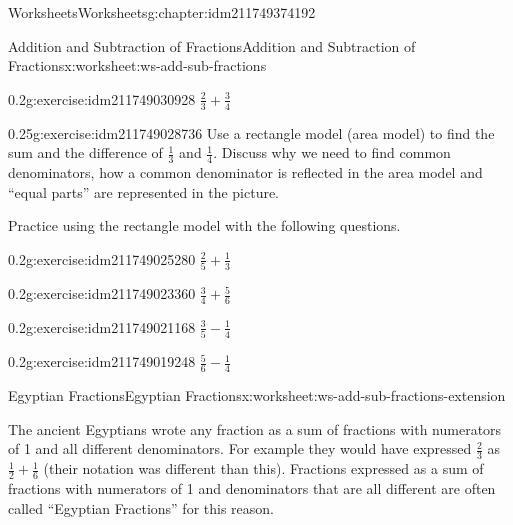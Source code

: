 \documentclass[twoside,11pt,]{book}
\begin{document}
\begin{chapterptx}{Worksheets}{}{Worksheets}{}{}{g:chapter:idm211749374192}
\begin{worksheet-section-numberless}{Addition and Subtraction of Fractions}{}{Addition and Subtraction of Fractions}{}{}{x:worksheet:ws-add-sub-fractions}
\begin{divisionexercise}{3}{}{0.2}{g:exercise:idm211749030928}%
\(\frac{2}{3} + \frac{3}{4} \)%
\end{divisionexercise}%
\clearpage
\begin{divisionexercise}{4}{}{0.25}{g:exercise:idm211749028736}%
Use a rectangle model (area model) to find the sum and the difference of \(\frac{1}{3} \) and \(\frac{1}{4} \).  Discuss why we need to find common denominators, how a common denominator is reflected in the area model and “equal parts” are represented in the picture.%
\end{divisionexercise}%
\begin{introduction}{}%
Practice using the rectangle model with the following questions.%
\end{introduction}%
\begin{divisionexercise}{5}{}{0.2}{g:exercise:idm211749025280}%
\(\frac{2}{5} + \frac{1}{3} \)%
\end{divisionexercise}%
\begin{divisionexercise}{6}{}{0.2}{g:exercise:idm211749023360}%
\(\frac{3}{4} + \frac{5}{6} \)%
\end{divisionexercise}%
\clearpage
\begin{divisionexercise}{7}{}{0.2}{g:exercise:idm211749021168}%
\(\frac{3}{5} - \frac{1}{4}  \)%
\end{divisionexercise}%
\begin{divisionexercise}{8}{}{0.2}{g:exercise:idm211749019248}%
\(\frac{5}{6} - \frac{1}{4} \)%
\end{divisionexercise}%
\end{worksheet-section-numberless}
\restoregeometry
%
%
\typeout{************************************************}
\typeout{************************************************}
%
\begin{worksheet-section-numberless}{Egyptian Fractions}{}{Egyptian Fractions}{}{}{x:worksheet:ws-add-sub-fractions-extension}
\begin{introduction}{}%
The ancient Egyptians wrote any fraction as a sum of fractions with numerators of 1 and all different denominators.  For example they would have expressed \(\frac{2}{3} \) as \(\frac{1}{2} + \frac{1}{6} \) (their notation was different than this).  Fractions expressed as a sum of fractions with numerators of 1 and denominators that are all different are often called “Egyptian Fractions” for this reason.%

\end{introduction}
\end{worksheet-section-numberless}
\end{chapterptx}
\end{document}
